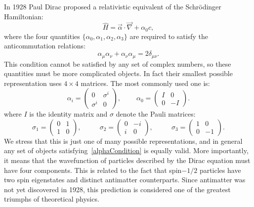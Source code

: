 In 1928 Paul Dirac proposed a relativistic equivalent of the Schr\"odinger Hamiltonian:
\begin{equation}
 	\widehat{H} = \vec{\alpha} \cdot \vec{\nabla} + \alpha_0 c,
 \end{equation}
where the four quantities $\{\alpha_0,\alpha_1,\alpha_2,\alpha_3\}$ are required to satisfy the anticommutation relations:
\begin{equation} \label{alphaCondition}
\alpha_{\mu} \alpha_{\nu}+\alpha_{\nu} \alpha_{\mu} =2\delta_{\mu \nu}.
\end{equation}
This condition cannot be satisfied by any set of complex numbers, so these quantities must be more complicated objects. In fact their smallest possible representation uses $4\times4$ matrices. The most commonly used one is:
\begin{equation} \label{DiracAlpha}
    \alpha_i = \left(\begin{matrix}0 & \sigma^i\\ \sigma^i & 0 \end{matrix}\right),~~~~~~~~~~\alpha_0 = \left(\begin{matrix} I & 0 \\ 0 & -I \end{matrix}\right).
\end{equation}
where $I$ is the identity matrix and $\sigma$ denote the Pauli matrices:
\begin{equation}
    \sigma_1 = \left(\begin{matrix}0 & 1 \\ 1 & 0 \end{matrix}\right),~~~~~~~~~~~~\sigma_2 = \left(\begin{matrix} 0 & -i \\ i & 0 \end{matrix}\right),~~~~~~~~~~~~\sigma_3 = \left(\begin{matrix} 1 & 0 \\ 0 & -1 \end{matrix}\right).
\end{equation}
We stress that this is just one of many possible representations, and in general any set of objects satisfying~\eqref{alphaCondition} is equally valid. More importantly, it means that the wavefunction of particles described by the Dirac equation must have four components. This is related to the fact that spin$-1/2$ particles have two spin eigenstates and distinct antimatter counterparts. Since antimatter was not yet discovered in 1928, this prediction is considered one of the greatest triumphs of theoretical physics.

